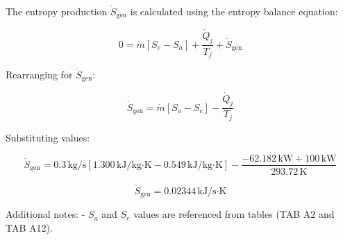 The entropy production \( \dot{S}_{\text{gen}} \) is calculated using the entropy balance equation:  

\[
0 = \dot{m} \left[ S_e - S_a \right] + \frac{\dot{Q}_j}{T_j} + \dot{S}_{\text{gen}}
\]

Rearranging for \( \dot{S}_{\text{gen}} \):  

\[
\dot{S}_{\text{gen}} = \dot{m} \left[ S_a - S_e \right] - \frac{\dot{Q}_j}{T_j}
\]

Substituting values:  

\[
\dot{S}_{\text{gen}} = 0.3 \, \text{kg/s} \left[ 1.300 \, \text{kJ/kg·K} - 0.549 \, \text{kJ/kg·K} \right] - \frac{-62.182 \, \text{kW} + 100 \, \text{kW}}{293.72 \, \text{K}}
\]

\[
\dot{S}_{\text{gen}} = 0.02344 \, \text{kJ/s·K}
\]  

Additional notes:  
- \( S_a \) and \( S_e \) values are referenced from tables (TAB A2 and TAB A12).